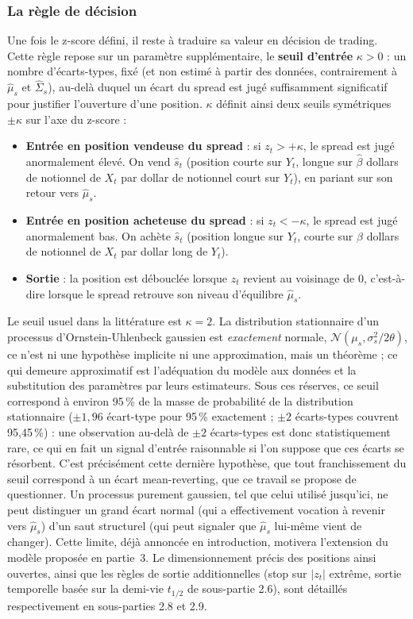 \documentclass{article}
\begin{document}
\subsubsection*{La règle de décision}
Une fois le z-score défini, il reste à traduire sa valeur en décision de trading. Cette règle repose sur un paramètre supplémentaire, le \textbf{seuil d'entrée} $\kappa > 0$ : un nombre d'écarts-types, fixé (et non estimé à partir des données, contrairement à $\hat\mu_s$ et $\hat{\Sigma}_s$), au-delà duquel un écart du spread est jugé suffisamment significatif pour justifier l'ouverture d'une position. $\kappa$ définit ainsi deux seuils symétriques $\pm\kappa$ sur l'axe du z-score :
\begin{itemize}
\item \textbf{Entrée en position vendeuse du spread} : si $z_t > +\kappa$, le spread est jugé anormalement élevé. On vend $\hat{s}_t$ (position courte sur $Y_t$, longue sur $\hat\beta$ dollars de notionnel de $X_t$ par dollar de notionnel court sur $Y_t$), en pariant sur son retour vers $\hat\mu_s$.
\item \textbf{Entrée en position acheteuse du spread} : si $z_t < -\kappa$, le spread est jugé anormalement bas. On achète $\hat{s}_t$ (position longue sur $Y_t$, courte sur $\hat\beta$ dollars de notionnel de $X_t$ par dollar long de $Y_t$).
\item \textbf{Sortie} : la position est débouclée lorsque $z_t$ revient au voisinage de $0$, c'est-à-dire lorsque le spread retrouve son niveau d'équilibre $\hat\mu_s$.
\end{itemize}
Le seuil usuel dans la littérature est $\kappa = 2$. La distribution stationnaire d'un processus d'Ornstein-Uhlenbeck gaussien est \emph{exactement} normale, $\mathcal{N}(\mu_s,\sigma_s^2/2\theta)$, ce n'est ni une hypothèse implicite ni une approximation, mais un théorème ; ce qui demeure approximatif est l'adéquation du modèle aux données et la substitution des paramètres par leurs estimateurs. Sous ces réserves, ce seuil correspond à environ 95\,\% de la masse de probabilité de la distribution stationnaire ($\pm 1{,}96$ écart-type pour 95\,\% exactement ; $\pm 2$ écarts-types couvrent 95{,}45\,\%) : une observation au-delà de $\pm 2$ écarts-types est donc statistiquement rare, ce qui en fait un signal d'entrée raisonnable si l'on suppose que ces écarts se résorbent.
C'est précisément cette dernière hypothèse, que tout franchissement du seuil correspond à un écart mean-reverting, que ce travail se propose de questionner. Un processus purement gaussien, tel que celui utilisé jusqu'ici, ne peut distinguer un grand écart normal (qui a effectivement vocation à revenir vers $\hat\mu_s$) d'un saut structurel (qui peut signaler que $\hat\mu_s$ lui-même vient de changer). Cette limite, déjà annoncée en introduction, motivera l'extension du modèle proposée en partie~3.
Le dimensionnement précis des positions ainsi ouvertes, ainsi que les règles de sortie additionnelles (stop sur $|z_t|$ extrême, sortie temporelle basée sur la demi-vie $t_{1/2}$ de sous-partie 2.6), sont détaillés respectivement en sous-parties 2.8 et 2.9.
\end{document}
